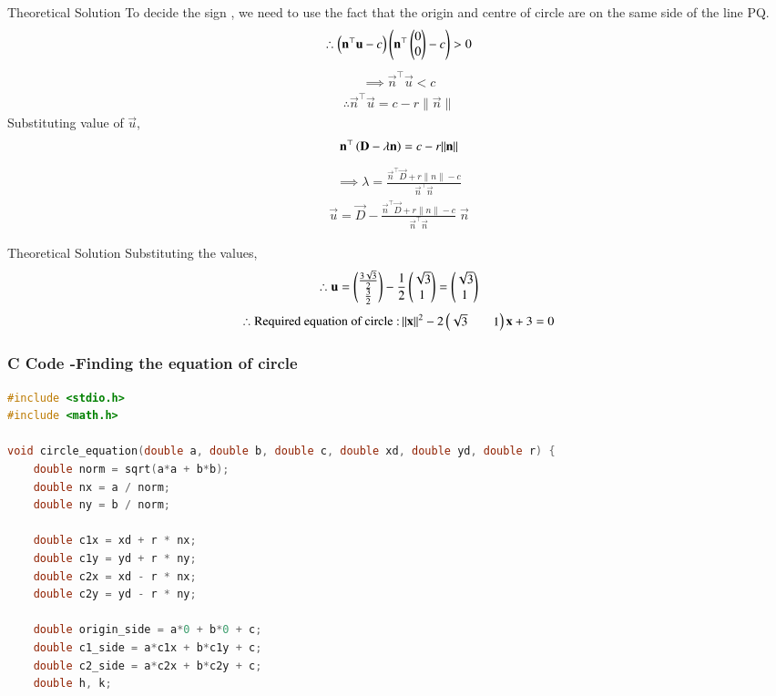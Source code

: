 \documentclass{beamer}
\begin{document}
\begin{frame}{Theoretical Solution}
To decide the sign , we need to use the fact that the origin and centre of circle are on the same side of the line PQ.
\begin{align}
    \therefore \left(\mathbf{n}^{\top}\mathbf{u}-c\right)\left(\mathbf{n}^{\top}\begin{pmatrix}0\\0\end{pmatrix}-c\right)>0
\end{align}
\begin{align}
    \implies \vec{n}^{\top}\vec{u}<c
\end{align}
\begin{align}
    \therefore \vec{n}^{\top}\vec{u}=c-r\|\vec{n}\|
\end{align}
Substituting value of $\vec{u}$,
\begin{align}
\mathbf{n}^{\top}\left(\mathbf{D}-\lambda\mathbf{n}\right)=c-r\|\mathbf{n}\|
\end{align}
\begin{align}
    \implies \lambda=\frac{\vec{n}^{\top}\vec{D}+r\|n\|-c}{\vec{n}^{\top}\vec{n}}
\end{align}
\begin{align}
    \vec{u}=\vec{D}-\frac{\vec{n}^{\top}\vec{D}+r\|n\|-c}{\vec{n}^{\top}\vec{n}}\;\vec{n}
\end{align}
\end{frame}

\begin{frame}{Theoretical Solution}
Substituting the values,
\begin{align}
    \therefore \mathbf{u}=\begin{pmatrix}\frac{3\sqrt{3}}{2}\\\frac{3}{2}\end{pmatrix}
-\frac{1}{2}\begin{pmatrix}\sqrt{3}\\1\end{pmatrix}=\begin{pmatrix}\sqrt{3}\\1\end{pmatrix}
\end{align}
\begin{align}
    \therefore \text{Required equation of circle :\,}\|\mathbf{x}\|^2-2\begin{pmatrix}\sqrt{3}&&1\end{pmatrix}\mathbf{x}+3=0
\end{align}
\end{frame}

\begin{frame}[fragile]
    \frametitle{C Code -Finding the equation of circle}

    \begin{lstlisting}[language=C]
#include <stdio.h>
#include <math.h>

void circle_equation(double a, double b, double c, double xd, double yd, double r) {
    double norm = sqrt(a*a + b*b);
    double nx = a / norm;
    double ny = b / norm;
    
    double c1x = xd + r * nx;
    double c1y = yd + r * ny;
    double c2x = xd - r * nx;
    double c2y = yd - r * ny;

    double origin_side = a*0 + b*0 + c;
    double c1_side = a*c1x + b*c1y + c;
    double c2_side = a*c2x + b*c2y + c;
    double h, k;


    \end{lstlisting}
\end{frame}
\end{document}
